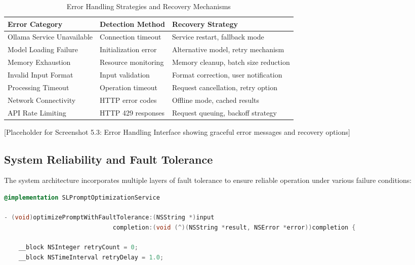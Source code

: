 \begin{table}[H]
\begin{table}[H]
\begin{table}[H]
\centering
\caption{Error Handling Strategies and Recovery Mechanisms}
\label{tab:error_handling}
{\begin{tabular}{lll}
\toprule
\textbf{Error Category} & \textbf{Detection Method} & \textbf{Recovery Strategy} \\
\midrule
Ollama Service Unavailable & Connection timeout & Service restart, fallback mode \\
Model Loading Failure & Initialization error & Alternative model, retry mechanism \\
Memory Exhaustion & Resource monitoring & Memory cleanup, batch size reduction \\
Invalid Input Format & Input validation & Format correction, user notification \\
Processing Timeout & Operation timeout & Request cancellation, retry option \\
Network Connectivity & HTTP error codes & Offline mode, cached results \\
API Rate Limiting & HTTP 429 responses & Request queuing, backoff strategy \\
\bottomrule
\end{tabular}}
\end{table}

[Placeholder for Screenshot 5.3: Error Handling Interface showing graceful error messages and recovery options]

\subsection{System Reliability and Fault Tolerance}

The system architecture incorporates multiple layers of fault tolerance to ensure reliable operation under various failure conditions:

\begin{lstlisting}[language=C,basicstyle=\footnotesize\ttfamily,frame=single,breaklines=true,columns=flexible,caption={Fault Tolerance Implementation},label={lst:fault_tolerance}]
@implementation SLPromptOptimizationService

- (void)optimizePromptWithFaultTolerance:(NSString *)input 
                              completion:(void (^)(NSString *result, NSError *error))completion {
    
    __block NSInteger retryCount = 0;
    __block NSTimeInterval retryDelay = 1.0;
    

\end{lstlisting}
\end{table}
\end{table}
